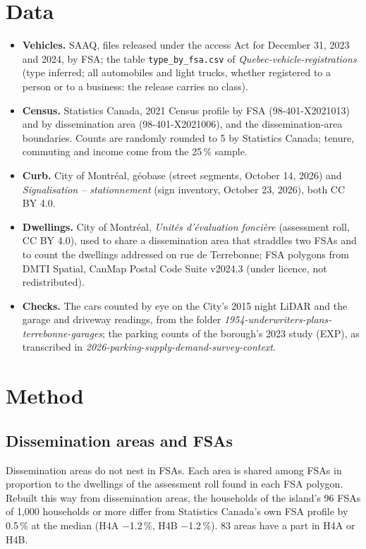 \documentclass[11pt,a4paper]{article}
\begin{document}
\section{Data}
\begin{itemize}
\item \textbf{Vehicles.} SAAQ, files released under the access Act for December 31, 2023 and 2024, by FSA; the table \texttt{type\_by\_fsa.csv} of \emph{Quebec-vehicle-registrations} (type inferred; all automobiles and light trucks, whether registered to a person or to a business: the release carries no class).
\item \textbf{Census.} Statistics Canada, 2021 Census profile by FSA (98-401-X2021013) and by dissemination area (98-401-X2021006), and the dissemination-area boundaries. Counts are randomly rounded to 5 by Statistics Canada; tenure, commuting and income come from the 25\,\% sample.
\item \textbf{Curb.} City of Montréal, géobase (street segments, October 14, 2026) and \emph{Signalisation -- stationnement} (sign inventory, October 23, 2026), both CC BY 4.0.
\item \textbf{Dwellings.} City of Montréal, \emph{Unités d\textquoteright{}évaluation foncière} (assessment roll, CC BY 4.0), used to share a dissemination area that straddles two FSAs and to count the dwellings addressed on rue de Terrebonne; FSA polygons from DMTI Spatial, CanMap Postal Code Suite v2024.3 (under licence, not redistributed).
\item \textbf{Checks.} The cars counted by eye on the City\textquoteright{}s 2015 night LiDAR and the garage and driveway readings, from the folder \emph{1954-underwriters-plans-terrebonne-garages}; the parking counts of the borough\textquoteright{}s 2023 study (EXP), as transcribed in \emph{2026-parking-supply-demand-survey-context}.
\end{itemize}

\section{Method}
\subsection{Dissemination areas and FSAs}
Dissemination areas do not nest in FSAs. Each area is shared among FSAs in proportion to the dwellings of the assessment roll found in each FSA polygon. Rebuilt this way from dissemination areas, the households of the island\textquoteright{}s 96 FSAs of 1{,}000 households or more differ from Statistics Canada\textquoteright{}s own FSA profile by 0.5\,\% at the median (H4A $-$1.2\,\%, H4B $-$1.2\,\%). 83 areas have a part in H4A or H4B.
\end{document}

